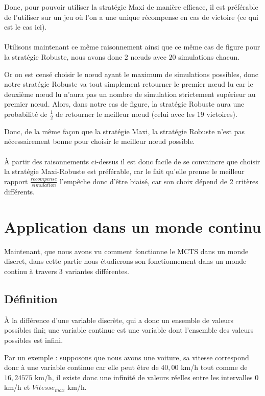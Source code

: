 \documentclass[pdftex,french, english]{article}	%
\begin{document}
Donc, pour pouvoir utiliser la stratégie Maxi de manière efficace, il est préférable de l'utiliser sur un jeu où l'on a une unique récompense en cas de victoire (ce qui est le cas ici).
\\ \\
Utilisons maintenant ce même raisonnement ainsi que ce même cas de figure pour la stratégie Robuste, nous avons donc $2$ nœuds avec $20$ simulations chacun. 

Or on est censé choisir le nœud ayant le maximum de simulations possibles, donc notre stratégie Robuste va tout simplement retourner le premier nœud lu car le deuxième nœud lu n'aura pas un nombre de simulation strictement supérieur au premier nœud. Alors, dans notre cas de figure, la stratégie Robuste aura une probabilité de $\frac{1}{2}$ de retourner le meilleur nœud (celui avec les $19$ victoires).

Donc, de la même façon que la stratégie Maxi, la stratégie Robuste n'est pas nécessairement bonne pour choisir le meilleur nœud possible.
\\ \\
À partir des raisonnements ci-dessus il est donc facile de se convaincre que choisir la stratégie Maxi-Robuste est préférable, car le fait qu'elle prenne le meilleur rapport $\frac{recompense}{simulation}$ l'empêche donc d'être biaisé, car son choix dépend de 2 critères différents.

\newpage

\section{Application dans un monde continu} \label{continu}

Maintenant, que nous avons vu comment fonctionne le MCTS dans un monde discret, dans cette partie nous étudierons son fonctionnement dans un monde continu à travers 3 variantes différentes.
	\subsection{Définition}

	À la différence d'une variable discrète, qui a donc un ensemble de valeurs possibles fini; une variable continue est une variable dont l'ensemble des valeurs possibles est infini.

	Par un exemple : supposons que nous avons une voiture, sa vitesse correspond donc à une variable continue car elle peut être de $40,00$ km/h tout comme de $16,24575$ km/h, il existe donc une infinité de valeurs réelles entre les intervalles $0$ km/h et $Vitesse_{max}$ km/h. \\
\end{document}
